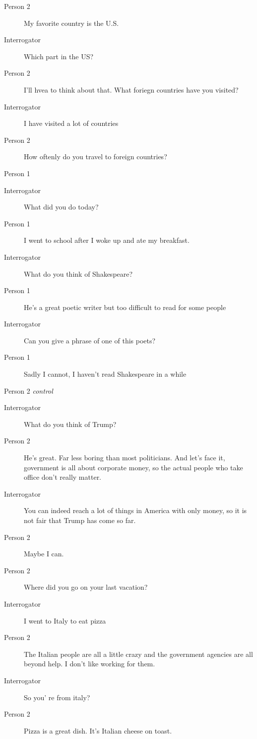 \begin{itemize}
\begin{description}
\begin{description}
               \item [Person 2] My favorite country is the U.S.
               \item [Interrogator] Which part in the US?
               \item [Person 2] I'll hvea to think about that. What foriegn countries have you visited?
               \item [Interrogator] I have visited a lot of countries
               \item [Person 2] How oftenly do you travel to foreign countries?
            \end{description}
         \item [Second conversation] Person 1
            \begin{description}
               \item [Interrogator] What did you do today?
               \item [Person 1] I went to school after I woke up and ate my breakfast.
               \item [Interrogator] What do you think of Shakespeare?
               \item [Person 1] He's a great poetic writer but too difficult to read for some people
               \item [Interrogator] Can you give a phrase of one of this poets?
               \item [Person 1] Sadly I cannot, I haven't read Shakespeare in a while
            \end{description}
         \item [Second conversation] Person 2 \textit{control}
            \begin{description}
               \item [Interrogator] What do you think of Trump?
               \item [Person 2] He's great. Far less boring than most politicians. And let's face it, government is all about corporate money, so the actual people who take office don't really matter.
               \item [Interrogator] You can indeed reach a lot of things in America with only money, so it is not fair that Trump has come so far.
               \item [Person 2] Maybe I can.
               \item [Person 2] Where did you go on your last vacation?
               \item [Interrogator] I went to Italy to eat pizza
               \item [Person 2] The Italian people are all a little crazy and the government agencies are all beyond help. I don't like working for them.
               \item [Interrogator] So you' re from italy?
               \item [Person 2] Pizza is a great dish. It's Italian cheese on toast.
            \end{description}
      \end{description}


\end{itemize}
